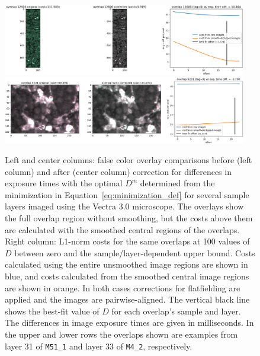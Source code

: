 \documentclass[letterpaper,11pt]{article}
\newcommand{\refeq}[1]{Equation~\ref{#1}}
\begin{document}
\begin{figure}[!ht]
\centering
\includegraphics[width=0.95\textwidth]{images/methods/cost_examples_vectra/overlay_comp_random_10478_offset=17.778}
\includegraphics[width=0.95\textwidth]{images/methods/cost_examples_vectra/overlay_comp_random_892_offset=21.314}
\caption{\footnotesize Left and center columns: false color overlay comparisons before (left column) and after (center column) correction for differences in exposure times with the optimal $D^{m}$ determined from the minimization in \refeq{eq:minimization_def} for several sample layers imaged using the Vectra 3.0 microscope. The overlays show the full overlap region without smoothing, but the costs above them are calculated with the smoothed central regions of the overlaps. Right column: L1-norm costs for the same overlaps at 100 values of $D$ between zero and the sample/layer-dependent upper bound. Costs calculated using the entire unsmoothed image regions are shown in blue, and costs calculated from the smoothed central image regions are shown in orange. In both cases corrections for flatfielding are applied and the images are pairwise-aligned. The vertical black line shows the best-fit value of $D$ for each overlap's sample and layer. The differences in image exposure times are given in milliseconds. In the upper and lower rows the overlaps shown are examples from layer 31 of \texttt{M51\_1} and layer 33 of \texttt{M4\_2}, respectively.}
\label{fig:overlap_cost_examples_vectra_2}
\end{figure}
\end{document}
